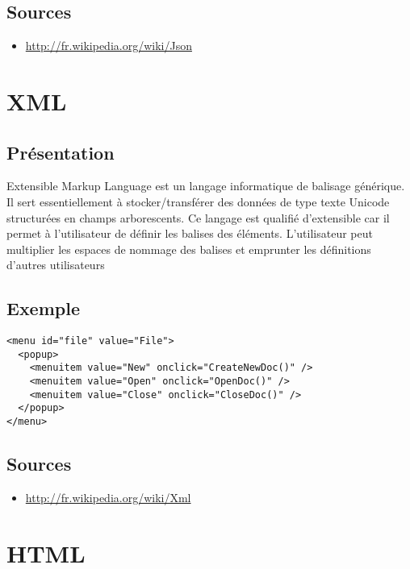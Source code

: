 \documentclass[a4paper,10pt]{report}
\begin{document}
    \subsection{Sources}

\begin{itemize}
 \item \url{http://fr.wikipedia.org/wiki/Json}
\end{itemize}


  \section{XML}

    \subsection{Présentation}

Extensible Markup Language est un langage informatique de balisage générique. 
Il sert essentiellement à stocker/transférer des données de type texte Unicode 
structurées en champs arborescents. Ce langage est qualifié d’extensible car 
il permet à l'utilisateur de définir les balises des éléments. L'utilisateur 
peut multiplier les espaces de nommage des balises et emprunter les définitions 
d'autres utilisateurs

    \subsection{Exemple}

\begin{verbatim}
<menu id="file" value="File">
  <popup>
    <menuitem value="New" onclick="CreateNewDoc()" />
    <menuitem value="Open" onclick="OpenDoc()" />
    <menuitem value="Close" onclick="CloseDoc()" />
  </popup>
</menu>
\end{verbatim} 

    \subsection{Sources}

\begin{itemize}
 \item \url{http://fr.wikipedia.org/wiki/Xml}
\end{itemize}


  \section{HTML}
\end{document}
